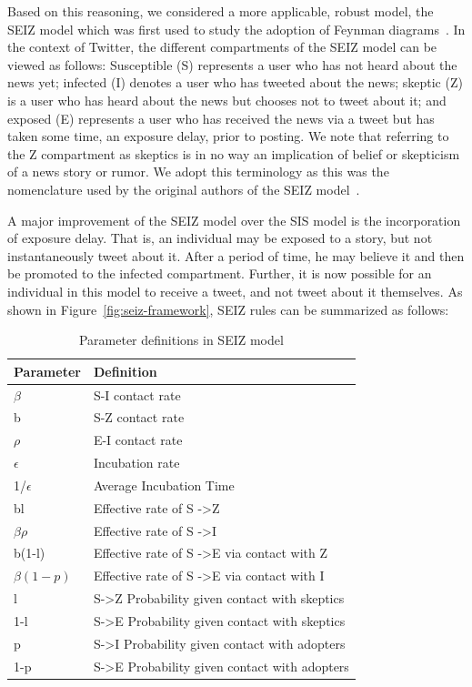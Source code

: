 Based on this reasoning, we considered a more applicable, robust model, the SEIZ model which was first used to study the adoption of Feynman diagrams~\cite{powerofgoodidea:2006}. In the context of Twitter, the different compartments of the SEIZ model can be viewed as follows: Susceptible (S) represents a user who has not heard about the news yet; infected (I) denotes a user who has tweeted about the news; skeptic (Z) is a user who has heard about the news but chooses not to tweet about it; and exposed (E) represents a user who has received the news via a tweet but has taken some time, an exposure delay, prior to posting. We note that referring to the Z compartment as skeptics is in no way an implication of belief or skepticism of a news story or rumor. We adopt this terminology as this was the nomenclature used by the original authors of the SEIZ model~\cite{powerofgoodidea:2006}.

A major improvement of the SEIZ model over the SIS model is the incorporation of exposure delay. That is, an individual may be exposed to a story, but not instantaneously tweet about it. After a period of time, he may believe it and then be promoted to the infected compartment. Further, it is now possible for an individual in this model to receive a tweet, and not tweet about it themselves. As shown in Figure~\ref{fig:seiz-framework}, SEIZ rules can be summarized as follows:

\begin{table}[t] %
\small
\caption{Parameter definitions in SEIZ model\cite{powerofgoodidea:2006}}
\vspace{0.5em}
\centering
\begin{tabular}{ p{4cm}  p{8cm} }
\hline
\textbf{Parameter} & \textbf{Definition} \\ [1ex]
\hline
$\beta$ & S-I contact rate \\[1ex]
b & S-Z contact rate \\[1ex]
$\rho$ & E-I contact rate \\[1ex]
$\epsilon$ & Incubation rate \\[1ex]
1/$\epsilon$ &  Average Incubation Time \\[1ex]
bl & Effective rate of S -\textgreater Z  \\ [1ex]
$\beta\rho$ & Effective rate of S -\textgreater I  \\ [1ex]
b(1-l) & Effective rate of S -\textgreater E via contact with Z  \\ [1ex]
$\beta (1-p)$ & Effective rate of S -\textgreater E via contact with I \\ [1ex]
l & S-\textgreater Z Probability given contact with skeptics \\[1ex]
1-l & S-\textgreater E Probability given contact with skeptics \\ [1ex]
p & S-\textgreater I Probability given contact with adopters \\ [1ex]
1-p & S-\textgreater E Probability given contact with adopters \\ [1ex]
\hline
\end{tabular}
\label{table:parameters}
\end{table}



